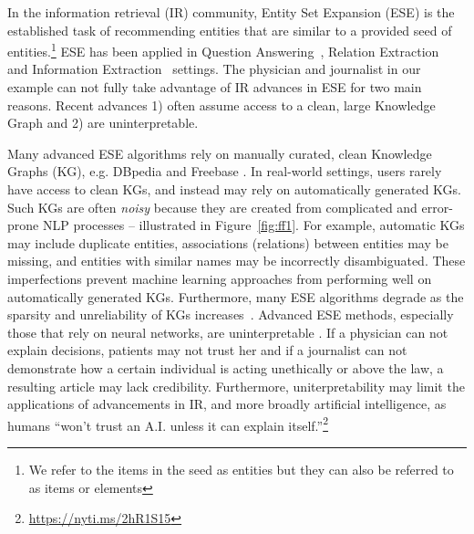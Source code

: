 \documentclass[a4paper]{article}
\newcommand{\figref}[1]{Figure~\ref{#1}}
\newcommand{\mycite}[1]{\cite{#1}}%
\newcommand{\mynewcite}[1]{\cite{#1}}%
\begin{document}
In the information retrieval (IR) community, Entity Set Expansion (ESE) is the established task of recommending
entities that are similar to a provided seed of entities.\footnote{We refer to the items in
the seed as entities but they can also be referred to as items or elements}
ESE has been applied in Question Answering~\mycite{wang-EtAl:2008:EMNLP2}, 
Relation Extraction~\mycite{lang-henderson:2013:NAACL-HLT} and Information Extraction~\mycite{hegrishman2015demos} settings. 
The physician and journalist in our example can
not fully take advantage of IR advances in ESE for two main reasons. Recent advances 1) often assume
access to a clean, large Knowledge Graph and 2) are uninterpretable.
 
Many advanced ESE algorithms rely on manually curated, clean Knowledge Graphs (KG),
e.g. DBpedia \mycite{auer2007dbpedia} and Freebase \mycite{bollacker2008freebase}. 
In real-world settings, users rarely have access to clean KGs,
and instead %
may rely on automatically generated KGs. Such KGs are often
\textit{noisy} because they are created from complicated
and error-prone NLP processes -- illustrated in \figref{fig:ff1}. %
For example, automatic KGs may include duplicate entities, associations (relations) between
entities may be missing, and entities with similar names may be incorrectly disambiguated.
These imperfections prevent
machine learning approaches %
from performing
well on automatically generated KGs. 
Furthermore, many ESE algorithms degrade as the sparsity and unreliability of KGs
increases~\mycite{pujara2017sparsity,rastogi2017vertex}.
%
Advanced ESE methods, especially those that rely on neural networks, are
uninterpretable \mycite{mitra2017neural}. If a physician can not explain decisions, patients
may not trust her and if a journalist can not demonstrate how a certain individual is acting unethically or above the law,
a resulting article may lack credibility.
Furthermore, uniterpretability may limit the applications of advancements in IR, and more broadly artificial 
intelligence,
as humans ``won't trust an A.I. unless it can explain
itself.''\footnote{\url{https://nyti.ms/2hR1S15}} 
\end{document}

